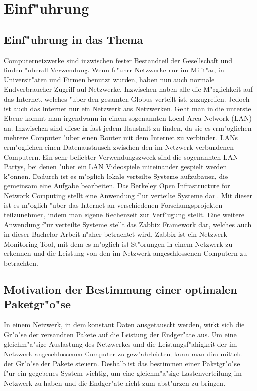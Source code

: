 \chapter{Einf"uhrung}
\label{cha:einfuehrung}

\section{Einf"uhrung in das Thema} 
Computernetzwerke sind inzwischen fester Bestandteil der Gesellschaft und finden "uberall Verwendung. %
Wenn fr"uher Netzwerke nur im Milit"ar, in Universit"aten und Firmen benutzt wurden, haben nun auch %
normale Endverbraucher Zugriff auf Netzwerke. Inzwischen haben alle die M"oglichkeit auf das Internet, welches "uber den %
gesamten Globus verteilt ist, zuzugreifen. Jedoch ist auch das Internet nur ein Netzwerk aus Netzwerken. %
Geht man in die unterste Ebene kommt man irgendwann in einem sogenannten Local Area Network (LAN) an. Inzwischen sind diese in fast jedem %
Haushalt zu finden, da sie es erm"oglichen mehrere Computer "uber einen Router mit dem Internet %
zu verbinden. LANs erm"oglichen einen Datenaustausch zwischen den im Netzwerk verbundenen Computern. %
Ein sehr beliebter Verwendungszweck sind die sogenannten LAN-Partys, bei denen "uber %
ein LAN Videospiele miteinander gespielt werden k"onnen. %
Dadurch ist es m"oglich lokale verteilte Systeme aufzubauen, die gemeinsam eine Aufgabe %
bearbeiten. Das Berkeley Open Infrastructure for Network Computing stellt eine Anwendung %
f"ur verteilte Systeme dar \autocite{uni:boinc}. Mit dieser ist es m"oglich "uber das %
Internet an verschiedenen Forschungsprojekten teilzunehmen, indem man eigene %
Rechenzeit zur Verf"ugung stellt. Eine weitere Anwendung f"ur verteilte Systeme stellt %
das Zabbix Framework dar, welches auch in dieser Bachelor Arbeit n"aher betrachtet wird. %
Zabbix ist ein Netzwerk Monitoring Tool, mit dem es m"oglich ist St"orungen in einem  Netzwerk %
zu erkennen und die Leistung von den im Netzwerk angeschlossenen Computern zu betrachten. %

\section{Motivation der Bestimmung einer optimalen Paketgr"o"se}
In einem Netzwerk, in dem konstant Daten ausgetauscht werden, wirkt sich die Gr"o"se der %
versandten Pakete auf die Leistung der Endger"ate aus. Um eine gleichm"a"sige Auslastung des Netzwerkes %
und die Leistungsf"ahigkeit der im Netzwerk angeschlossenen Computer zu gew"ahrleisten, %
kann man dies mittels der Gr"o"se der Pakete steuern. Deshalb ist das bestimmen einer Paketgr"o"se %
f"ur ein gegebenes System wichtig, um eine gleichm"a"sige Lastenverteilung im Netzwerk zu haben %
und die Endger"ate nicht zum abst"urzen zu bringen. %

